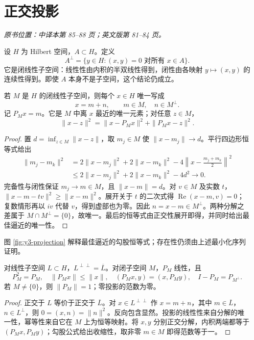 \section{正交投影}\label{sec:yosida-03-01}
\noindent\textit{原书位置：中译本第 85--88 页；英文版第 81--84 页。}

\begin{definition}[正交补]
设 $H$ 为 Hilbert 空间，$A\subset H$。定义
\[
 A^\perp=\{y\in H:(x,y)=0\text{ 对所有 }x\in A\}.
\]
它是闭线性子空间：线性性由内积的半双线性得到，闭性由各映射 $y\mapsto(x,y)$ 的连续性得到。即使 $A$ 本身不是子空间，这个结论仍成立。
\end{definition}

\begin{theorem}[正交分解与最佳逼近]\label{thm:y3-projection}
若 $M$ 是 $H$ 的闭线性子空间，则每个 $x\in H$ 唯一写成
\[
 x=m+n,\qquad m\in M,\quad n\in M^\perp.
\]
记 $P_Mx=m$。它是 $M$ 中离 $x$ 最近的唯一元素；对任意 $z\in M$，
\[
 \|x-z\|^2=\|x-P_Mx\|^2+\|P_Mx-z\|^2.
\]
\end{theorem}
\begin{proof}
置 $d=\inf_{z\in M}\|x-z\|$，取 $m_j\in M$ 使 $\|x-m_j\|\to d$。平行四边形恒等式给出
\[
 \begin{aligned}
 \|m_j-m_k\|^2
 &=2\|x-m_j\|^2+2\|x-m_k\|^2
   -4\left\|x-\frac{m_j+m_k}{2}\right\|^2\\
 &\le2\|x-m_j\|^2+2\|x-m_k\|^2-4d^2\to0.
 \end{aligned}
\]
完备性与闭性保证 $m_j\to m\in M$，且 $\|x-m\|=d$。对 $v\in M$ 及实数 $t$，$\|x-m-tv\|^2\ge\|x-m\|^2$。展开关于 $t$ 的二次式得 $\operatorname{Re}(x-m,v)=0$；复数情形再以 $iv$ 代替 $v$，得到虚部也为零。因此 $n=x-m\in M^\perp$。两种分解之差属于 $M\cap M^\perp=\{0\}$，故唯一。最后的恒等式由正交性展开即得，并同时给出最佳逼近的唯一性。
\end{proof}

图 \ref{fig:y3-projection} 解释最佳逼近的勾股恒等式；存在性仍须由上述最小化序列证明。



\begin{corollary}[双重正交补与投影的性质]\label{cor:y3-double-perp}
对线性子空间 $L\subset H$，$L^{\perp\perp}=\overline L$。对闭子空间 $M$，$P_M$ 线性，且
\[
 P_M^2=P_M,\quad \|P_Mx\|\le\|x\|,\quad
 (P_Mx,y)=(x,P_My),\quad I-P_M=P_{M^\perp}.
\]
若 $M\ne\{0\}$，则 $\|P_M\|=1$；零投影的范数为零。
\end{corollary}
\begin{proof}
正交于 $L$ 等价于正交于 $\overline L$。对 $x\in L^{\perp\perp}$ 作 $x=m+n$，其中 $m\in\overline L$，$n\in L^\perp$，则 $0=(x,n)=\|n\|^2$。反向包含显然。投影的线性性来自分解的唯一性，幂等性来自它在 $M$ 上为恒等映射。将 $x,y$ 分别正交分解，内积两端都等于 $(P_Mx,P_My)$；勾股公式给出收缩性，取非零 $m\in M$ 即得范数等于一。
\end{proof}


